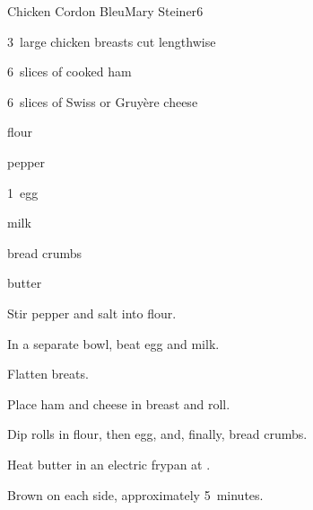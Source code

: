 \begin{recipe}{Chicken Cordon Bleu}{Mary Steiner}{6}

\begin{ingredients}
\item 3~large chicken breasts cut lengthwise
\item 6~slices of cooked ham
\item 6~slices of Swiss or Gruy\`ere cheese
\item \C{\quarter} flour
\item {}
\item pepper
\item 1~egg
\item {} milk
\item {} bread crumbs
\item {} butter
\end{ingredients}

\begin{directions}
\item Stir pepper and salt into flour.
\item In a separate bowl, beat egg and milk.
\item Flatten breats.
\item Place ham and cheese in breast and roll.
\item Dip rolls in flour, then egg, and, finally, bread crumbs.
\item Heat butter in an electric frypan at .
\item Brown on each side, approximately 5~minutes.
\end{directions}

\end{recipe}
